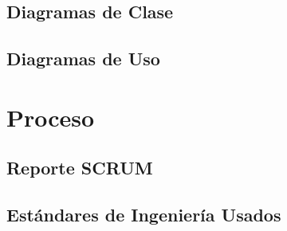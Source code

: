 \documentclass[stu, 12pt, letterpaper, donotrepeattitle, floatsintext, natbib]{apa7}
\begin{document}
\newpage
\subsection{Diagramas de Clase}

\subsection{Diagramas de Uso}


\section{Proceso}

\subsection{Reporte SCRUM}

\subsection{Estándares de Ingeniería Usados}
\end{document}
